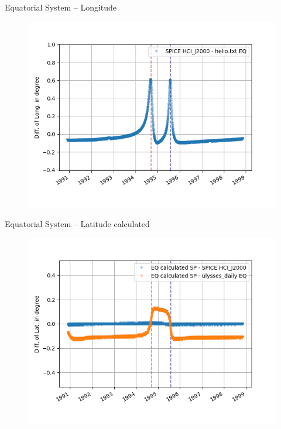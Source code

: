 \documentclass{beamer}
\begin{document}
\begin{frame}{Equatorial System -- Longitude}
\begin{figure}									
	\includegraphics[width=1\textwidth]{Pics/EQ_LONG.png}
\end{figure}
\end{frame}

\begin{frame}{Equatorial System -- Latitude calculated}
\begin{figure}									
	\includegraphics[width=1\textwidth]{Pics/EQ_LAT_CALC.png}
\end{figure}
\end{frame}
\end{document}
